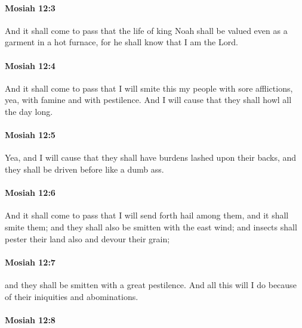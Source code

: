 		\paragraph{Mosiah 12:3} %
			\label{MOSIAH-12-3}

			And it shall come to pass that
			the life of king Noah shall be valued even as a garment in a hot furnace,
			for he shall know that I am the Lord.

		\paragraph{Mosiah 12:4} %
			\label{MOSIAH-12-4}

			And it shall come to pass that
			I will smite this my people with sore afflictions,
			yea, with famine and with pestilence.
			And I will cause that they shall howl all the day long.

		\paragraph{Mosiah 12:5} %
			\label{MOSIAH-12-5}

			Yea, and I will cause that they shall have burdens lashed upon their backs,
			and they shall be driven before like a dumb ass.

		\paragraph{Mosiah 12:6} %
			\label{MOSIAH-12-6}

			And it shall come to pass that I will send forth hail among them,
			and it shall smite them;
			and they shall also be smitten with the east wind;
			and insects shall pester their land also and devour their grain;

		\paragraph{Mosiah 12:7} %
			\label{MOSIAH-12-7}

			and they shall be smitten with a great pestilence.
			And all this will I do because of their iniquities and abominations.

		\paragraph{Mosiah 12:8} %
			\label{MOSIAH-12-8}

